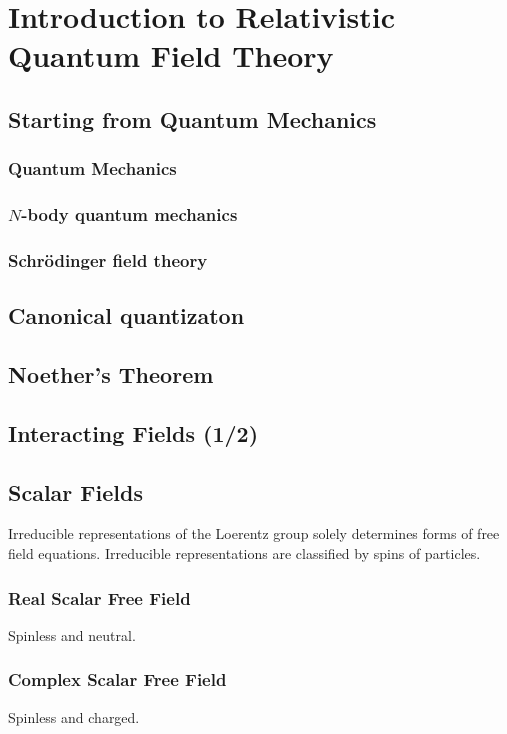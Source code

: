 \documentclass{jarticle}
\newcommand{\myqftsrcdirectory}[0]{./}
\newcommand{\mainqftsrcdirectory}[0]{../src_qft}
\begin{document}
\section{Introduction to Relativistic Quantum Field Theory}
\subsection{Starting from Quantum Mechanics}
\subsubsection{Quantum Mechanics}

\subsubsection{$N$-body quantum mechanics}

\subsubsection{Schr\"odinger field theory}

\subsection{Canonical quantizaton}

\subsection{Noether's Theorem}

\subsection{Interacting Fields (1/2)}


\subsection{Scalar Fields}
Irreducible representations of the Loerentz group solely 
determines forms of free field equations.
Irreducible representations are classified by
spins of particles.
\subsubsection{Real Scalar Free Field}
Spinless and neutral.

\subsubsection{Complex Scalar Free Field}
Spinless and charged.

\end{document}
